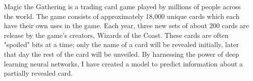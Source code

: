Magic the Gathering is a trading card game played by millions
of people across the world. The game consists of approximately 
18,000 unique cards which each have their own uses in the game.
Each year, three new sets of about 200 cards are release by the game's 
creators, Wizards of the Coast. These cards are often "spoiled"
bits at a time; only the name of a card will be revealed initially,
later that day the rest of the card will be unveiled. By harnessing
the power of deep learning neural networks, I have created a model
to predict information about a partially revealed card.
 